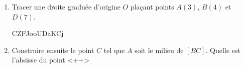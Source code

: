 
\begin{enumerate}
    \item
        Tracer une droite graduée d'origine \( O\) plaçant points \( A(3)\), \( B(4)\) et \( D(7)\). 

CZFJooUDaKCj

    \item
        Construire ensuite le point \( C\) tel que \( A\) soit le milieu de \( [BC]\). Quelle est l'absisse du point \( \)<++>
        
\end{enumerate}
